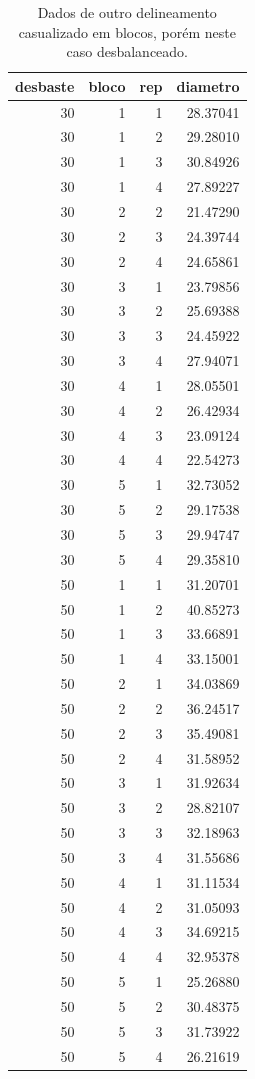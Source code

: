 \documentclass[
]{article}
\begin{document}
\begin{table}

\caption{\label{tab:unnamed-chunk-73}Dados de outro delineamento casualizado em blocos, porém neste caso desbalanceado.}
\centering
\begin{tabular}[t]{r|r|r|r}
\hline
desbaste & bloco & rep & diametro\\
\hline
30 & 1 & 1 & 28.37041\\
\hline
30 & 1 & 2 & 29.28010\\
\hline
30 & 1 & 3 & 30.84926\\
\hline
30 & 1 & 4 & 27.89227\\
\hline
30 & 2 & 2 & 21.47290\\
\hline
30 & 2 & 3 & 24.39744\\
\hline
30 & 2 & 4 & 24.65861\\
\hline
30 & 3 & 1 & 23.79856\\
\hline
30 & 3 & 2 & 25.69388\\
\hline
30 & 3 & 3 & 24.45922\\
\hline
30 & 3 & 4 & 27.94071\\
\hline
30 & 4 & 1 & 28.05501\\
\hline
30 & 4 & 2 & 26.42934\\
\hline
30 & 4 & 3 & 23.09124\\
\hline
30 & 4 & 4 & 22.54273\\
\hline
30 & 5 & 1 & 32.73052\\
\hline
30 & 5 & 2 & 29.17538\\
\hline
30 & 5 & 3 & 29.94747\\
\hline
30 & 5 & 4 & 29.35810\\
\hline
50 & 1 & 1 & 31.20701\\
\hline
50 & 1 & 2 & 40.85273\\
\hline
50 & 1 & 3 & 33.66891\\
\hline
50 & 1 & 4 & 33.15001\\
\hline
50 & 2 & 1 & 34.03869\\
\hline
50 & 2 & 2 & 36.24517\\
\hline
50 & 2 & 3 & 35.49081\\
\hline
50 & 2 & 4 & 31.58952\\
\hline
50 & 3 & 1 & 31.92634\\
\hline
50 & 3 & 2 & 28.82107\\
\hline
50 & 3 & 3 & 32.18963\\
\hline
50 & 3 & 4 & 31.55686\\
\hline
50 & 4 & 1 & 31.11534\\
\hline
50 & 4 & 2 & 31.05093\\
\hline
50 & 4 & 3 & 34.69215\\
\hline
50 & 4 & 4 & 32.95378\\
\hline
50 & 5 & 1 & 25.26880\\
\hline
50 & 5 & 2 & 30.48375\\
\hline
50 & 5 & 3 & 31.73922\\
\hline
50 & 5 & 4 & 26.21619\\
\hline
\end{tabular}
\end{table}
\end{document}
